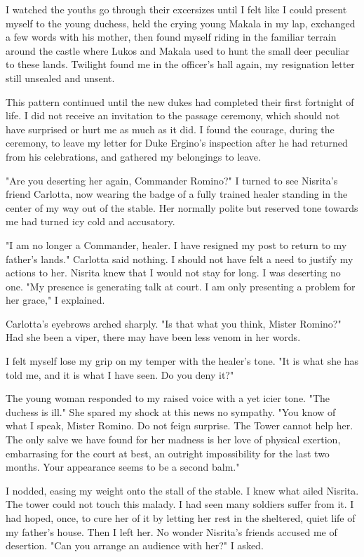 \documentclass{article}
\begin{document}
I watched the youths go through their excersizes until I felt like I could present myself to the young duchess, held the crying young Makala in my lap, exchanged a few words with his mother, then found myself riding in the familiar terrain around the castle where Lukos and Makala used to hunt the small deer peculiar to these lands. Twilight found me in the officer's hall again, my resignation letter still unsealed and unsent.

This pattern continued until the new dukes had completed their first fortnight of life. I did not receive an invitation to the passage ceremony, which should not have surprised or hurt me as much as it did. I found the courage, during the ceremony, to leave my letter for Duke Ergino's inspection after he had returned from his celebrations, and gathered my belongings to leave.

"Are you deserting her again, Commander Romino?" I turned to see Nisrita's friend Carlotta, now wearing the badge of a fully trained healer standing in the center of my way out of the stable. Her normally polite but reserved tone towards me had turned icy cold and accusatory. 

"I am no longer a Commander, healer. I have resigned my post to return to my father's lands." Carlotta said nothing. I should not have felt a need to justify my actions to her. Nisrita knew that I would not stay for long. I was deserting no one. "My presence is generating talk at court. I am only presenting a problem for her grace," I explained.

Carlotta's eyebrows arched sharply. "Is that what you think, Mister Romino?" Had she been a viper, there may have been less venom in her words.

I felt myself lose my grip on my temper with the healer's tone. "It is what she has told me, and it is what I have seen. Do you deny it?"

The young woman responded to my raised voice with a yet icier tone. "The duchess is ill." She spared my shock at this news no sympathy. "You know of what I speak, Mister Romino. Do not feign surprise. The Tower cannot help her. The only salve we have found for her madness is her love of physical exertion, embarrasing for the court at best, an outright impossibility for the last two months. Your appearance seems to be a second balm."

I nodded, easing my weight onto the stall of the stable. I knew what ailed Nisrita. The tower could not touch this malady. I had seen many soldiers suffer from it. I had hoped, once, to cure her of it by letting her rest in the sheltered, quiet life of my father's house. Then I left her. No wonder Nisrita's friends accused me of desertion. "Can you arrange an audience with her?" I asked.
\end{document}

